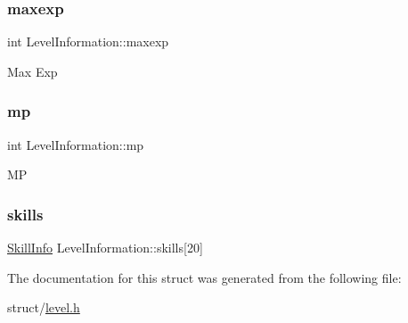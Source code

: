 \subsubsection{\texorpdfstring{maxexp}{maxexp}}
{\footnotesize\ttfamily int Level\+Information\+::maxexp}

Max Exp \mbox{\label{structLevelInformation_ab2707ea8a438f56f90f16ecbc93a50f9}} 
\subsubsection{\texorpdfstring{mp}{mp}}
{\footnotesize\ttfamily int Level\+Information\+::mp}

MP \mbox{\label{structLevelInformation_a7bc26887f1f51f648d55966480470349}} 
\subsubsection{\texorpdfstring{skills}{skills}}
{\footnotesize\ttfamily \hyperlink{skill_8h_aa7a27dc845bcc95c786a871b170bf850}{Skill\+Info} Level\+Information\+::skills\mbox{[}20\mbox{]}}



The documentation for this struct was generated from the following file\+:\begin{DoxyCompactItemize}
\item 
struct/\hyperlink{level_8h}{level.\+h}\end{DoxyCompactItemize}
